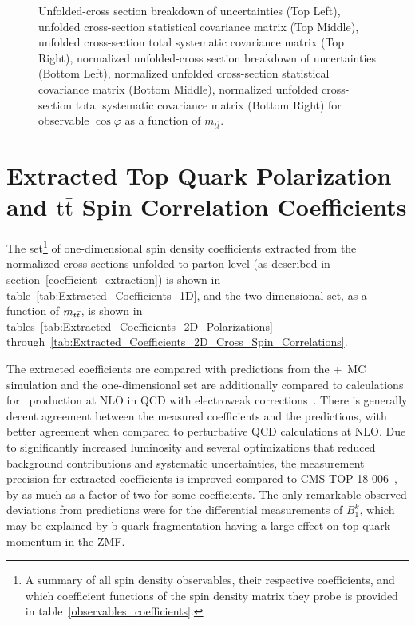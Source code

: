 \begin{figure}[htb]
\begin{center}
\caption{Unfolded-cross section breakdown of uncertainties (Top Left), unfolded cross-section statistical covariance matrix (Top Middle), unfolded cross-section total systematic covariance matrix (Top Right), normalized unfolded-cross section breakdown of uncertainties (Bottom Left), normalized unfolded cross-section statistical covariance matrix (Bottom Middle), normalized unfolded cross-section total systematic covariance matrix (Bottom Right) for  observable $\cos\varphi$ as a function of $m_{t\bar{t}}$.}
\label{fig:ll_cHel_mttbar_uncertainties}
\end{center}
\end{figure}
\clearpage





\section{Extracted Top Quark Polarization and \ensuremath{\mathrm{t\bar{t}}} Spin Correlation Coefficients}
The set\footnote{A summary of all spin density observables, their respective coefficients, and which coefficient functions of the spin density matrix they probe is provided in table~\ref{observables_coefficients}.} of one-dimensional spin density coefficients extracted from the normalized cross-sections unfolded to parton-level (as described in section~\ref{coefficient_extraction}) is shown in table~\ref{tab:Extracted_Coefficients_1D}, and the two-dimensional set, as a function of $m_{t\bar{t}}$, is shown in tables~\ref{tab:Extracted_Coefficients_2D_Polarizations} through~\ref{tab:Extracted_Coefficients_2D_Cross_Spin_Correlations}.

The extracted coefficients are compared with predictions from the \Powheg+\Pythia\ MC simulation and the one-dimensional set are additionally compared to calculations for \ttbar\ production at NLO in QCD with electroweak corrections~\cite{Bernreuther}.
There is generally decent agreement between the measured coefficients and the predictions, with better agreement when compared to perturbative QCD calculations at NLO.
Due to significantly increased luminosity and several optimizations that reduced background contributions and systematic uncertainties, the measurement precision for extracted coefficients is improved compared to CMS TOP-18-006~\cite{Sirunyan:2681777}, by as much as a factor of two for some coefficients. 
The only remarkable observed deviations from predictions were for the differential measurements of $B_{1}^{k}$, which may be explained by b-quark fragmentation having a large effect on top quark momentum in the \ttbar ZMF.


